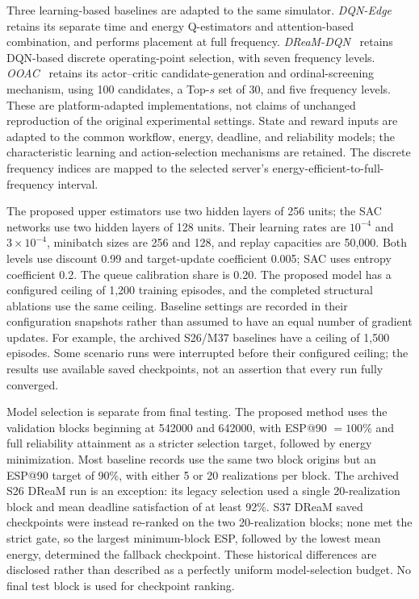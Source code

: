 Three learning-based baselines are adapted to the same simulator.
\emph{DQN-Edge}~\cite{wen2026} retains its separate time and energy
Q-estimators and attention-based combination, and performs placement
at full frequency. \emph{DReaM-DQN}~\cite{esnaashari2025dream} retains
DQN-based discrete operating-point selection, with seven frequency
levels. \emph{OOAC}~\cite{wang2025ordinal} retains its actor--critic
candidate-generation and ordinal-screening mechanism, using 100
candidates, a Top-$s$ set of 30, and five frequency levels. These are
platform-adapted implementations, not claims of unchanged reproduction
of the original experimental settings. State and reward inputs are
adapted to the common workflow, energy, deadline, and reliability
models; the characteristic learning and action-selection mechanisms
are retained. The discrete frequency indices are mapped to the
selected server's energy-efficient-to-full-frequency interval.

The proposed upper estimators use two hidden layers of 256 units;
the SAC networks use two hidden layers of 128 units. Their learning
rates are $10^{-4}$ and $3\times10^{-4}$, minibatch sizes are 256 and
128, and replay capacities are 50,000. Both levels use discount 0.99
and target-update coefficient 0.005; SAC uses entropy coefficient 0.2.
The queue calibration share is 0.20. The proposed model has a configured
ceiling of 1,200 training episodes, and the completed structural
ablations use the same ceiling. Baseline settings are recorded in
their configuration snapshots rather than assumed to have an equal
number of gradient updates. For example, the archived S26/M37
baselines have a ceiling of 1,500 episodes. Some scenario runs were
interrupted before their configured ceiling; the results use available
saved checkpoints, not an assertion that every run fully converged.

Model selection is separate from final testing. The proposed method
uses the validation blocks beginning at 542000 and 642000, with
ESP@90 $=100\%$ and full reliability attainment as a stricter selection
target, followed by energy minimization. Most baseline records use
the same two block origins but an ESP@90 target of 90\%, with either
5 or 20 realizations per block. The archived S26 DReaM run is an
exception: its legacy selection used a single 20-realization block
and mean deadline satisfaction of at least 92\%. S37 DReaM saved
checkpoints were instead re-ranked on the two 20-realization blocks;
none met the strict gate, so the largest minimum-block ESP, followed
by the lowest mean energy, determined the fallback checkpoint.
These historical differences are disclosed rather than described
as a perfectly uniform model-selection budget. No final test block
is used for checkpoint ranking.

